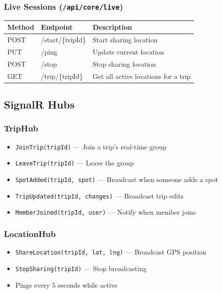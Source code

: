 \documentclass[12pt,letterpaper]{article}
\begin{document}
\subsubsection{Live Sessions (\texttt{/api/core/live})}
\begin{tabular}{|l|l|l|}
\hline
\textbf{Method} & \textbf{Endpoint} & \textbf{Description} \\
\hline
POST & /start/\{tripId\} & Start sharing location \\
PUT  & /ping & Update current location \\
POST & /stop & Stop sharing location \\
GET  & /trip/\{tripId\} & Get all active locations for a trip \\
\hline
\end{tabular}

\subsection{SignalR Hubs}

\subsubsection{TripHub}
\begin{itemize}
  \item \texttt{JoinTrip(tripId)} --- Join a trip's real-time group
  \item \texttt{LeaveTrip(tripId)} --- Leave the group
  \item \texttt{SpotAdded(tripId, spot)} --- Broadcast when someone adds a spot
  \item \texttt{TripUpdated(tripId, changes)} --- Broadcast trip edits
  \item \texttt{MemberJoined(tripId, user)} --- Notify when member joins
\end{itemize}

\subsubsection{LocationHub}
\begin{itemize}
  \item \texttt{ShareLocation(tripId, lat, lng)} --- Broadcast GPS position
  \item \texttt{StopSharing(tripId)} --- Stop broadcasting
  \item Pings every 5 seconds while active
\end{itemize}
\end{document}
